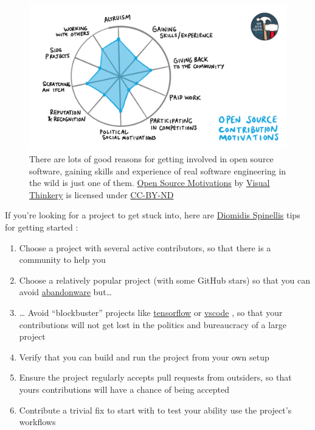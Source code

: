 \documentclass[
]{book}
\providecommand{\tightlist}{%
  \setlength{\itemsep}{0pt}\setlength{\parskip}{0pt}}
\begin{document}
\begin{figure}

{\centering \includegraphics[width=1\linewidth]{images/OS-contribution-motivations-1200x675} 

}

\caption{There are lots of good reasons for getting involved in open source software, gaining skills and experience of real software engineering in the wild is just one of them. \href{https://bryanmmathers.com/open-source-motivations}{Open Source Motivations} by \href{https://visualthinkery.com}{Visual Thinkery} is licensed under \href{https://creativecommons.org/licenses/by-nd/4.0/}{CC-BY-ND}}\label{fig:opensource-fig}
\end{figure}



If you're looking for a project to get stuck into, here are \href{https://en.wikipedia.org/wiki/Diomidis_Spinellis}{Diomidis Spinellis} tips for getting started \citep{Spinellis}:

\begin{enumerate}
\def\labelenumi{\arabic{enumi}.}
\tightlist
\item
  Choose a project with several active contributors, so that there is a community to help you
\item
  Choose a relatively popular project (with some GitHub stars) so that you can avoid \href{https://en.wikipedia.org/wiki/Abandonware}{abandonware} but\ldots{}
\item
  \ldots{} Avoid ``blockbuster'' projects like \href{https://github.com/tensorflow}{tensorflow} or \href{https://github.com/microsoft/vscode}{vscode} , so that your contributions will not get lost in the politics and bureaucracy of a large project
\item
  Verify that you can build and run the project from your own setup
\item
  Ensure the project regularly accepts pull requests from outsiders, so that yours contributions will have a chance of being accepted
\item
  Contribute a trivial fix to start with to test your ability use the project's workflows
\end{enumerate}
\end{document}
